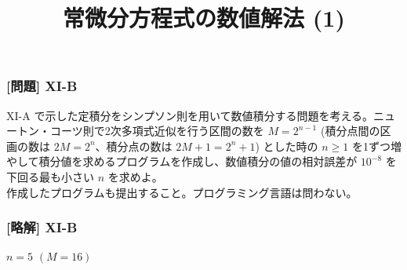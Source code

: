 \documentclass[dvipdfmx,aspectratio=169,20pt]{beamer}
\newcommand{\myfontsetting}[3]{{\fontsize{#1}{#2}\selectfont #3}}
\begin{document}
\graphicspath{{figs/}}

\begin{frame}
\frametitle{[問題] X\hspace{-.1em}I-B}

\myfontsetting{18pt}{18pt}{
X\hspace{-.1em}I-A で示した定積分をシンプソン則を用いて数値積分する問題を考える。ニュートン・コーツ則で2次多項式近似を行う区間の数を $M=2^{n-1}$ (積分点間の区画の数は $2M=2^n$、積分点の数は $2M+1=2^n+1$) とした時の $n\ge 1$ を1ずつ増やして積分値を求めるプログラムを作成し、数値積分の値の相対誤差が $10^{-8}$ を下回る最も小さい $n$ を求めよ。
}\\
\myfontsetting{12pt}{12pt}{
作成したプログラムも提出すること。プログラミング言語は問わない。
}
\end{frame}
\begin{frame}
\frametitle{[略解] X\hspace{-.1em}I-B}

$n=5$ $(M=16)$

\end{frame}

\title{\myfontsetting{32pt}{32pt}{常微分方程式の数値解法 (1)}}


\end{document}
